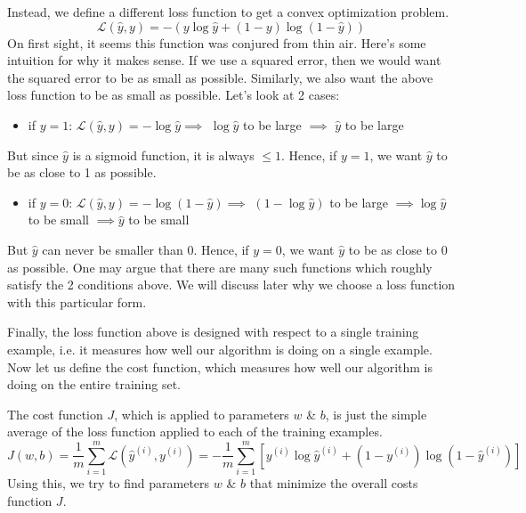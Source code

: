 \documentclass{article}[a4paper,12pt]
\theoremstyle{definition}
\newcommand{\Lagr}{\mathcal{L}}
\begin{document}
Instead, we define a different loss function to get a convex optimization problem. 
$$\boxed{\Lagr(\hat{y},y)=-(y\log\hat{y}+(1-y)\log(1-\hat{y}))}$$
On first sight, it seems this function was conjured from thin air. Here's some intuition for why it makes sense. If we use a squared error, then we would want the squared error to be as small as possible. Similarly, we also want the above loss function to be as small as possible. Let's look at 2 cases: 
\begin{itemize}
	\item if $y=1$: $\Lagr(\hat{y},y)=-\log\hat{y}\implies$ $\log\hat{y}$ to be large $\implies$  $\hat{y}$ to be large
\end{itemize}
But since $\hat{y}$ is a sigmoid function, it is always $\leqslant 1$. Hence, if $y=1$, we want $\hat{y}$ to be as close to 1 as possible.
\begin{itemize}
	\item if $y=0$: $\Lagr(\hat{y},y)=-\log(1-\hat{y})\implies$ $(1-\log\hat{y})$ to be large $\implies \log\hat{y}$ to be small $\implies \hat{y}$ to be small
\end{itemize}
But $\hat{y}$ can never be smaller than 0. Hence, if $y=0$, we want $\hat{y}$ to be as close to 0 as possible. One may argue that there are many such functions which roughly satisfy the 2 conditions above. We will discuss later why we choose a loss function with this particular form.
\vspace{6pt}

Finally, the loss function above is designed with respect to a single training example, i.e. it measures how well our algorithm is doing on a single example. Now let us define the cost function, which measures how well our algorithm is doing on the entire training set.
\vspace{6pt}

The cost function $J$, which is applied to parameters $w$ \& $b$, is just the simple average of the loss function applied to each of the training examples.
$$\boxed{J(w,b)=\dfrac{1}{m}\sum_{i=1}^{m}\Lagr(\hat{y}^{(i)},y^{(i)})=-\dfrac{1}{m}\sum_{i=1}^{m}\left[y^{(i)}\log\hat{y}^{(i)}+(1-y^{(i)})\log(1-\hat{y}^{(i)})\right]}$$
Using this, we try to find parameters $w$ \& $b$ that minimize the overall costs function $J$. 
\end{document}
